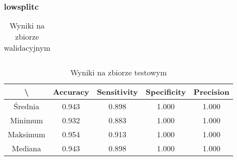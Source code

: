 \newpage
\subsubsection{lowsplitc}

\begin{table}[!h]
	\centering
	\caption{Wyniki na zbiorze walidacyjnym}
	\vspace{6pt}
	{\footnotesize
		\begin{tabular}{|c|c|c|c|c|}
      \hline
		\end{tabular}
	}
	\vspace{0pt}
\end{table}

\begin{table}[!h]
	\centering
	\caption{Wyniki na zbiorze testowym}
	\vspace{6pt}
	{\footnotesize
		\begin{tabular}{|c|c|c|c|c|}
      \hline \textbackslash & Accuracy & Sensitivity & Specificity & Precision \\
      \hline Średnia & 0.943 & 0.898 & 1.000 & 1.000 \\
      \hline Minimum & 0.932 & 0.883 & 1.000 & 1.000 \\
      \hline Maksimum & 0.954 & 0.913 & 1.000 & 1.000 \\
      \hline Mediana & 0.943 & 0.898 & 1.000 & 1.000 \\
      \hline
		\end{tabular}
	}
	\vspace{0pt}
\end{table}
